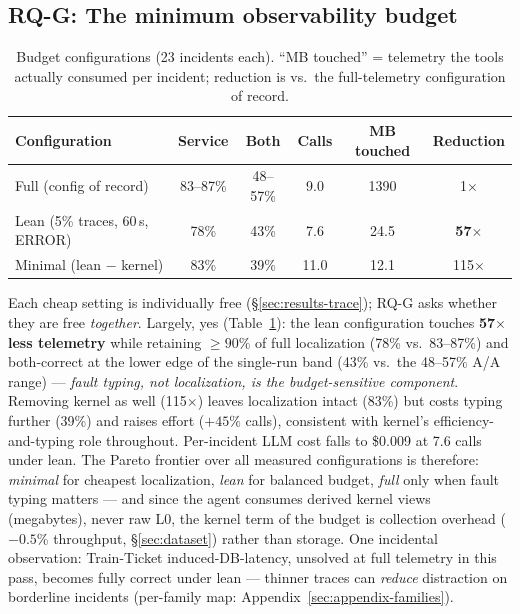 \subsection{RQ-G: The minimum observability budget}
\label{sec:results-budget}

\begin{table}[t]
\caption{Budget configurations (23 incidents each). ``MB touched'' = telemetry the
tools actually consumed per incident; reduction is vs.\ the full-telemetry
configuration of record.}
\label{tab:budget}
\begin{tabular}{lccccc}
\toprule
Configuration & Service & Both & Calls & MB touched & Reduction \\
\midrule
Full (config of record) & 83--87\% & 48--57\% & 9.0 & 1390 & 1$\times$ \\
Lean (5\% traces, 60\,s, ERROR) & 78\% & 43\% & 7.6 & 24.5 & \textbf{57$\times$} \\
Minimal (lean $-$ kernel) & 83\% & 39\% & 11.0 & 12.1 & 115$\times$ \\
\bottomrule
\end{tabular}
\end{table}

Each cheap setting is individually free (\S\ref{sec:results-trace}); RQ-G asks whether
they are free \emph{together}. Largely, yes (Table~\ref{tab:budget}): the lean
configuration touches \textbf{57$\times$ less telemetry} while retaining
${\ge}90\%$ of full localization (78\% vs.\ 83--87\%) and both-correct at the lower
edge of the single-run band (43\% vs.\ the 48--57\% A/A range) --- \emph{fault
typing, not localization, is the budget-sensitive component}. Removing kernel as well
(115$\times$) leaves localization intact (83\%) but costs typing further (39\%) and
raises effort ($+45\%$ calls), consistent with kernel's efficiency-and-typing role
throughout. Per-incident LLM cost falls to \$0.009 at 7.6 calls under lean. The
Pareto frontier over all measured configurations is therefore: \emph{minimal} for
cheapest localization, \emph{lean} for balanced budget, \emph{full} only when fault
typing matters --- and since the agent consumes derived kernel views (megabytes),
never raw L0, the kernel term of the budget is collection overhead ($-0.5$\%
throughput, \S\ref{sec:dataset}) rather than storage. One incidental observation:
Train-Ticket induced-DB-latency, unsolved at full telemetry in this pass, becomes
fully correct under lean --- thinner traces can \emph{reduce} distraction on
borderline incidents (per-family map: Appendix~\ref{sec:appendix-families}).
